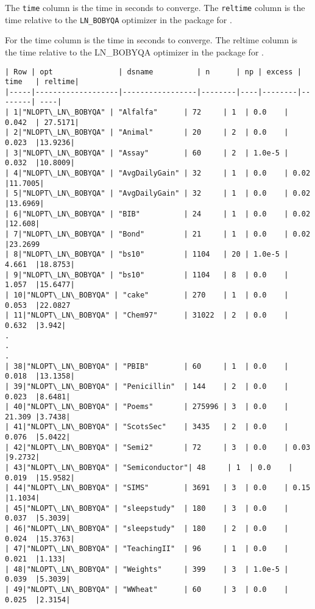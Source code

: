 \documentclass[article]{jss}
\begin{document}
The \texttt{time} column is the time in seconds to converge. The
\texttt{reltime} column is the time relative to the \texttt{LN\_BOBYQA}
optimizer in the  package for .

For  the time column is the time in seconds to converge. The reltime column is the time relative to the LN_BOBYQA optimizer in the  package for .

\begin{verbatim}
| Row | opt               | dsname          | n      | np | excess | time   | reltime|
|-----|-------------------|-----------------|--------|----|--------|--------| ----|
| 1|"NLOPT\_LN\_BOBYQA" | "Alfalfa"      | 72     | 1  | 0.0    | 0.042  | 27.5171|
| 2|"NLOPT\_LN\_BOBYQA" | "Animal"       | 20     | 2  | 0.0    | 0.023  |13.9236|
| 3|"NLOPT\_LN\_BOBYQA" | "Assay"        | 60     | 2  | 1.0e-5 | 0.032  |10.8009|
| 4|"NLOPT\_LN\_BOBYQA" | "AvgDailyGain" | 32     | 1  | 0.0    | 0.02   |11.7005|
| 5|"NLOPT\_LN\_BOBYQA" | "AvgDailyGain" | 32     | 1  | 0.0    | 0.02   |13.6969|
| 6|"NLOPT\_LN\_BOBYQA" | "BIB"          | 24     | 1  | 0.0    | 0.02   |12.608|
| 7|"NLOPT\_LN\_BOBYQA" | "Bond"         | 21     | 1  | 0.0    | 0.02   |23.2699
| 8|"NLOPT\_LN\_BOBYQA" | "bs10"         | 1104   | 20 | 1.0e-5 | 4.661  |18.8753|
| 9|"NLOPT\_LN\_BOBYQA" | "bs10"         | 1104   | 8  | 0.0    | 1.057  |15.6477|
| 10|"NLOPT\_LN\_BOBYQA" | "cake"        | 270    | 1  | 0.0    | 0.053  |22.0827
| 11|"NLOPT\_LN\_BOBYQA" | "Chem97"      | 31022  | 2  | 0.0    | 0.632  |3.942|
.
.
.
| 38|"NLOPT\_LN\_BOBYQA" | "PBIB"        | 60     | 1  | 0.0    | 0.018  |13.1358|
| 39|"NLOPT\_LN\_BOBYQA" | "Penicillin"  | 144    | 2  | 0.0    | 0.023  |8.6481|
| 40|"NLOPT\_LN\_BOBYQA" | "Poems"       | 275996 | 3  | 0.0    | 21.309 |3.7438|
| 41|"NLOPT\_LN\_BOBYQA" | "ScotsSec"    | 3435   | 2  | 0.0    | 0.076  |5.0422|
| 42|"NLOPT\_LN\_BOBYQA" | "Semi2"       | 72     | 3  | 0.0    | 0.03   |9.2732|
| 43|"NLOPT\_LN\_BOBYQA" | "Semiconductor"| 48     | 1  | 0.0    | 0.019  |15.9582|
| 44|"NLOPT\_LN\_BOBYQA" | "SIMS"        | 3691   | 3  | 0.0    | 0.15   |1.1034|
| 45|"NLOPT\_LN\_BOBYQA" | "sleepstudy"  | 180    | 3  | 0.0    | 0.037  |5.3039|
| 46|"NLOPT\_LN\_BOBYQA" | "sleepstudy"  | 180    | 2  | 0.0    | 0.024  |15.3763|
| 47|"NLOPT\_LN\_BOBYQA" | "TeachingII"  | 96     | 1  | 0.0    | 0.021  |1.133|
| 48|"NLOPT\_LN\_BOBYQA" | "Weights"     | 399    | 3  | 1.0e-5 | 0.039  |5.3039|
| 49|"NLOPT\_LN\_BOBYQA" | "WWheat"      | 60     | 3  | 0.0    | 0.025  |2.3154|
\end{verbatim}
\end{document}
